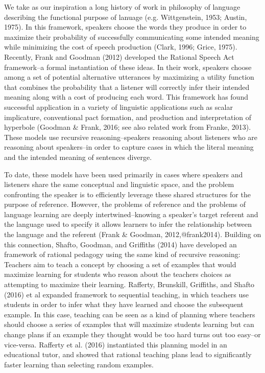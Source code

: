 \documentclass[english,,man,floatsintext]{apa6}
\begin{document}
We take as our inspiration a long history of work in philosophy of language describing the functional purpose of lanuage (e.g. Wittgenstein, 1953; Austin, 1975). In this framework, speakers choose the words they produce in order to maximize their probability of successfully communicating some intended meaning while minimizing the cost of speech production (Clark, 1996; Grice, 1975). Recently, Frank and Goodman (2012) developed the Rational Speech Act framework--a formal instantiation of these ideas. In their work, speakers choose among a set of potential alternative utterances by maximizing a utility function that combines the probability that a listener will correctly infer their intended meaning along with a cost of producing each word. This framework has found successful application in a variety of linguistic applications such as scalar implicature, conventional pact formation, and production and interpretation of hyperbole (Goodman \& Frank, 2016; see also related work from Franke, 2013). These models use recursive reasoning--speakers reasoning about listeners who are reasoning about speakers--in order to capture cases in which the literal meaning and the intended meaning of sentences diverge.

To date, these models have been used primarily in cases where speakers and listeners share the same conceptual and linguistic space, and the problem confronting the speaker is to efficiently leverage these shared structures for the purpose of reference. However, the problems of reference and the problems of language learning are deeply intertwined--knowing a speaker's target referent and the language used to specify it allows learners to infer the relationship between the language and the referent (Frank \& Goodman, 2012,@frank2014). Building on this connection, Shafto, Goodman, and Griffiths (2014) have developed an framework of rational pedagogy using the same kind of recursive reasoning: Teachers aim to teach a concept by choosing a set of examples that would maximize learning for students who reason about the teachers choices as attempting to maximize their learning. Rafferty, Brunskill, Griffiths, and Shafto (2016) et al expanded framework to sequential teaching, in which teachers use students in order to infer what they have learned and choose the subsequent example. In this case, teaching can be seen as a kind of planning where teachers should choose a series of examples that will maximize students learning but can change plans if an example they thought would be too hard turns out too easy--or vice-versa. Rafferty et al. (2016) instantiated this planning model in an educational tutor, and showed that rational teaching plans lead to significantly faster learning than selecting random examples.
\end{document}
